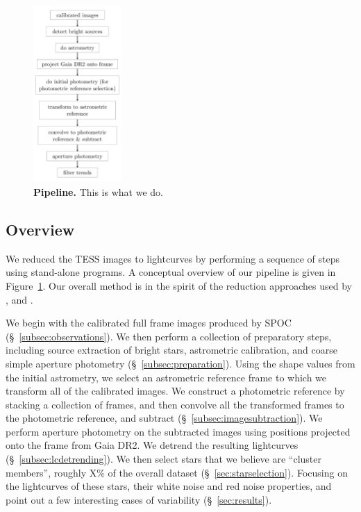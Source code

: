 \documentclass[12pt,twocolumn,tighten]{aastex62}
\begin{document}
\begin{figure}[t]
	\begin{center}
		\leavevmode
		\includegraphics[width=0.3\textwidth]{f2.pdf}
	\end{center}
	\vspace{-0.5cm}
	\caption{
    {\bf Pipeline.} This is what we do.
		\label{fig:pipeline}
	}
\end{figure}

\subsection{Overview}

We reduced the TESS images to lightcurves by performing a sequence of
steps using stand-alone programs.  A conceptual overview of our
pipeline is given in Figure~\ref{fig:pipeline}.  
Our overall method is in the spirit of the reduction approaches used
by \citet{Pal_2009}, \citet{soares-furtado_image_2017} and
\citet{oelkers_precision_2018}.

We begin with the calibrated full frame images produced by SPOC
(\S~\ref{subsec:observations}).  We then perform a collection of
preparatory steps, including source extraction of bright stars,
astrometric calibration, and coarse simple aperture
photometry (\S~\ref{subsec:preparation}).  Using the shape values from
the initial astrometry, we select an astrometric reference frame to
which we transform all of the calibrated images.  We construct a
photometric reference by stacking a collection of frames, and then
convolve all the transformed frames to the photometric reference, and
subtract (\S~\ref{subsec:imagesubtraction}).  We perform aperture
photometry on the subtracted images using positions projected onto the
frame from Gaia DR2.  We detrend the resulting lightcurves
(\S~\ref{subsec:lcdetrending}).  We then select stars that we believe
are ``cluster members'', roughly X\% of the overall dataset
(\S~\ref{sec:starselection}).  Focusing on the lightcurves of these
stars, their white noise and red noise properties, and point out a few
interesting cases of variability (\S~\ref{sec:results}).
\end{document}
